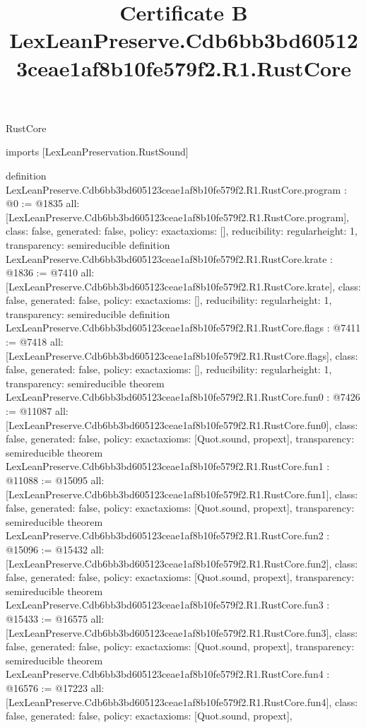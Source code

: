 \begin{lexlean}{RustCore}
\title{Certificate B LexLeanPreserve.Cdb6bb3bd605123ceae1af8b10fe579f2.R1.RustCore}
\begin{coremodule}
imports [LexLeanPreservation.RustSound]

definition LexLeanPreserve.Cdb6bb3bd605123ceae1af8b10fe579f2.R1.RustCore.program : @0 := @1835 {
  all: [LexLeanPreserve.Cdb6bb3bd605123ceae1af8b10fe579f2.R1.RustCore.program],
  class: false,
  generated: false,
  policy: exact{axioms: []},
  reducibility: regular{height: 1},
  transparency: semireducible
}
definition LexLeanPreserve.Cdb6bb3bd605123ceae1af8b10fe579f2.R1.RustCore.krate : @1836 := @7410 {
  all: [LexLeanPreserve.Cdb6bb3bd605123ceae1af8b10fe579f2.R1.RustCore.krate],
  class: false,
  generated: false,
  policy: exact{axioms: []},
  reducibility: regular{height: 1},
  transparency: semireducible
}
definition LexLeanPreserve.Cdb6bb3bd605123ceae1af8b10fe579f2.R1.RustCore.flags : @7411 := @7418 {
  all: [LexLeanPreserve.Cdb6bb3bd605123ceae1af8b10fe579f2.R1.RustCore.flags],
  class: false,
  generated: false,
  policy: exact{axioms: []},
  reducibility: regular{height: 1},
  transparency: semireducible
}
theorem LexLeanPreserve.Cdb6bb3bd605123ceae1af8b10fe579f2.R1.RustCore.fun0 : @7426 := @11087 {
  all: [LexLeanPreserve.Cdb6bb3bd605123ceae1af8b10fe579f2.R1.RustCore.fun0],
  class: false,
  generated: false,
  policy: exact{axioms: [Quot.sound, propext]},
  transparency: semireducible
}
theorem LexLeanPreserve.Cdb6bb3bd605123ceae1af8b10fe579f2.R1.RustCore.fun1 : @11088 := @15095 {
  all: [LexLeanPreserve.Cdb6bb3bd605123ceae1af8b10fe579f2.R1.RustCore.fun1],
  class: false,
  generated: false,
  policy: exact{axioms: [Quot.sound, propext]},
  transparency: semireducible
}
theorem LexLeanPreserve.Cdb6bb3bd605123ceae1af8b10fe579f2.R1.RustCore.fun2 : @15096 := @15432 {
  all: [LexLeanPreserve.Cdb6bb3bd605123ceae1af8b10fe579f2.R1.RustCore.fun2],
  class: false,
  generated: false,
  policy: exact{axioms: [Quot.sound, propext]},
  transparency: semireducible
}
theorem LexLeanPreserve.Cdb6bb3bd605123ceae1af8b10fe579f2.R1.RustCore.fun3 : @15433 := @16575 {
  all: [LexLeanPreserve.Cdb6bb3bd605123ceae1af8b10fe579f2.R1.RustCore.fun3],
  class: false,
  generated: false,
  policy: exact{axioms: [Quot.sound, propext]},
  transparency: semireducible
}
theorem LexLeanPreserve.Cdb6bb3bd605123ceae1af8b10fe579f2.R1.RustCore.fun4 : @16576 := @17223 {
  all: [LexLeanPreserve.Cdb6bb3bd605123ceae1af8b10fe579f2.R1.RustCore.fun4],
  class: false,
  generated: false,
  policy: exact{axioms: [Quot.sound, propext]},
}
\end{coremodule}
\end{lexlean}
